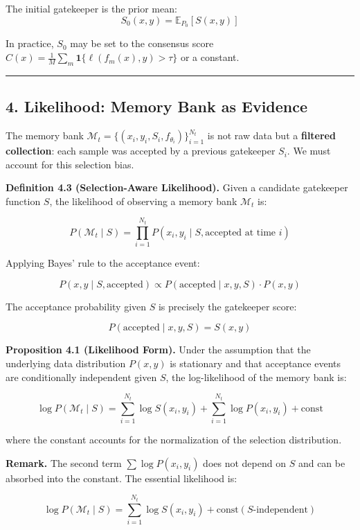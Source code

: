 \documentclass[
  12pt,
]{article}
\begin{document}
The initial gatekeeper is the prior mean:
\[S_0(x,y) = \mathbb{E}_{P_0}[S(x,y)]\]

In practice, \(S_0\) may be set to the consensus score
\(C(x) = \frac{1}{M}\sum_m \mathbf{1}\{\ell(f_m(x), y) > \tau\}\) or a
constant.

\begin{center}\rule{0.5\linewidth}{0.5pt}\end{center}

\subsection{4. Likelihood: Memory Bank as
Evidence}\label{likelihood-memory-bank-as-evidence}

The memory bank
\(\mathcal{M}_t = \{(x_i, y_i, S_i, f_{\theta_i})\}_{i=1}^{N_t}\) is not
raw data but a \textbf{filtered collection}: each sample was accepted by
a previous gatekeeper \(S_i\). We must account for this selection bias.

\textbf{Definition 4.3 (Selection-Aware Likelihood).} Given a candidate
gatekeeper function \(S\), the likelihood of observing a memory bank
\(\mathcal{M}_t\) is:

\[
P(\mathcal{M}_t \mid S) = \prod_{i=1}^{N_t} P(x_i, y_i \mid S, \text{accepted at time } i)
\]

Applying Bayes' rule to the acceptance event:

\[
P(x, y \mid S, \text{accepted}) \propto P(\text{accepted} \mid x, y, S) \cdot P(x, y)
\]

The acceptance probability given \(S\) is precisely the gatekeeper
score:

\[
P(\text{accepted} \mid x, y, S) = S(x, y)
\]

\textbf{Proposition 4.1 (Likelihood Form).} Under the assumption that
the underlying data distribution \(P(x,y)\) is stationary and that
acceptance events are conditionally independent given \(S\), the
log-likelihood of the memory bank is:

\[
\log P(\mathcal{M}_t \mid S) = \sum_{i=1}^{N_t} \log S(x_i, y_i) + \sum_{i=1}^{N_t} \log P(x_i, y_i) + \text{const}
\]

where the constant accounts for the normalization of the selection
distribution.

\textbf{Remark.} The second term \(\sum \log P(x_i, y_i)\) does not
depend on \(S\) and can be absorbed into the constant. The essential
likelihood is:

\[
\log P(\mathcal{M}_t \mid S) = \sum_{i=1}^{N_t} \log S(x_i, y_i) + \text{const}(S\text{-independent})
\]
\end{document}

